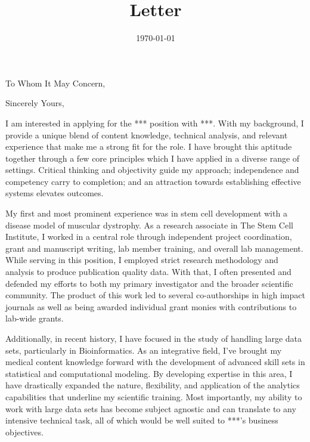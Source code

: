 \documentclass[10pt,letter,sans]{moderncv}
\newcommand{\company}{***}
\newcommand{\role}{***}
\begin{document}

\title{Letter}
\recipient{HR Department}{\company{} \\ STREET ADDRESS \\ CITY, STATE ZIP}
\date{\today}
\opening{To Whom It May Concern,}
\closing{Sincerely Yours,}
\makelettertitle{}

I am interested in applying for the \role{} position with \company{}. With my background, I provide a unique blend of content knowledge, technical analysis, and relevant experience that make me a strong fit for the role. I have brought this aptitude together through a few core principles which I have applied in a diverse range of settings. Critical thinking and objectivity guide my approach; independence and competency carry to completion; and an attraction towards establishing effective systems elevates outcomes.

My first and most prominent experience was in stem cell development with a disease model of muscular dystrophy. As a research associate in The Stem Cell Institute, I worked in a central role through independent project coordination, grant and manuscript writing, lab member training, and overall lab management. While serving in this position, I employed strict research methodology and analysis to produce publication quality data. With that, I often presented and defended my efforts to both my primary investigator and the broader scientific community. The product of this work led to several co-authorships in high impact journals as well as being awarded individual grant monies with contributions to lab-wide grants.

Additionally, in recent history, I have focused in the study of handling large data sets, particularly in Bioinformatics. As an integrative field, I've brought my medical content knowledge forward with the development of advanced skill sets in statistical and computational modeling. By developing expertise in this area, I have drastically expanded the nature, flexibility, and application of the analytics capabilities that underline my scientific training. Most importantly, my ability to work with large data sets has become subject agnostic and can translate to any intensive technical task, all of which would be well suited to \company{}'s business objectives.
\end{document}
